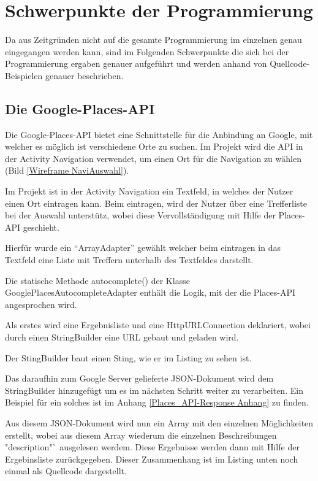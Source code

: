 \section{Schwerpunkte der Programmierung}
Da aus Zeitgr\"unden nicht auf die gesamte Programmierung im einzelnen genau eingegangen werden kann, sind im Folgenden Schwerpunkte die sich bei der Programmierung ergaben genauer aufgef\"uhrt und werden anhand von Quellcode-Beispielen genauer beschrieben.

\subsection{Die Google-Places-API}
Die Google-Places-\ac{API} bietet eine Schnittstelle f\"ur die Anbindung an Google, mit welcher es m\"oglich ist verschiedene Orte zu suchen. Im Projekt wird die \ac{API} in der Activity Navigation verwendet, um einen Ort f\"ur die Navigation zu w\"ahlen (Bild \ref{Wireframe NaviAuswahl}).

Im Projekt ist in der Activity Navigation ein Textfeld, in welches der Nutzer einen Ort eintragen kann. Beim eintragen, wird der Nutzer \"uber eine Trefferliste bei der Auswahl unterst\"utz, wobei diese Vervollst\"andigung mit Hilfe der Places-\ac{API} geschieht.

Hierf\"ur wurde ein "`ArrayAdapter"' gew\"ahlt welcher beim eintragen in das Textfeld eine Liste mit Treffern unterhalb des Textfeldes darstellt.

Die statische Methode autocomplete() der Klasse GooglePlacesAutocompleteAdapter enth\"alt die Logik, mit der die Places-\ac{API} angesprochen wird.

Als erstes wird eine Ergebnisliste und eine HttpURLConnection deklariert, wobei durch einen StringBuilder eine URL gebaut und geladen wird.

Der StingBuilder baut einen Sting, wie er im Listing zu sehen ist.


Das daraufhin zum Google Server gelieferte JSON-Dokument wird dem StringBuilder hinzugef\"ugt um es im n\"achsten Schritt weiter zu verarbeiten. Ein Beispiel f\"ur ein solches ist im Anhang \ref{Places_API-Response Anhang} zu finden.

Aus diesem JSON-Dokument wird nun ein Array mit den einzelnen M\"oglichkeiten erstellt, wobei aus diesem Array wiederum die einzelnen Beschreibungen "description"` ausgelesen werdem. Diese Ergebnisse werden dann mit Hilfe der Ergebinsliste zur\"uckgegeben. Dieser Zusammenhang ist im Listing unten noch einmal als Quellcode dargestellt.
\cite{PlacesAPIGoogle}

